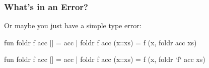 \documentclass[aspectratio=169, handout]{beamer}
\newcommand{\cmark}{{\color{green!80!black}\ding{51}}}
\newcommand{\xmark}{{\color{red}\ding{55}}}
\begin{document}
\begin{frame}[fragile]
  \frametitle{What's in an Error?}

  Or maybe you just have a simple type error:

  \pause
  \begin{center}
    \begin{minipage}[t][0.8in][t]{\textwidth}
      \begin{minipage}{0.2\textwidth}
        \centering
        \vspace{\fill}
        {\huge\xmark}
        \vspace{\fill}
      \end{minipage}
      \begin{minipage}{0.75\textwidth}
        {\small
          \begin{codeblock}[rulecolor=\color{red}, framerule=0.3mm]
            fun foldr f acc [] = acc
              | foldr f acc (x::xs) =
                  f (x, foldr acc xs)
          \end{codeblock}
          }
        \end{minipage}
    \end{minipage}
    \pause
    \begin{minipage}[t][0.8in][t]{\textwidth}
      \begin{minipage}{0.2\textwidth}
        \centering
        \vspace{\fill}
        {\huge\cmark}
        \vspace{\fill}
      \end{minipage}
      \begin{minipage}{0.75\textwidth}
        {\small
        \begin{codeblock}[rulecolor=\color{green!80!black}, framerule=0.3mm]
          fun foldr f acc [] = acc
            | foldr f acc (x::xs) =
                f (x, foldr `f` acc xs)
        \end{codeblock}
        }
      \end{minipage}
    \end{minipage}
  \end{center}
\end{frame}
\end{document}
